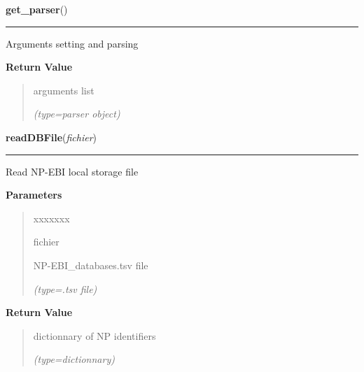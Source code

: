\hspace{.8\funcindent}\begin{boxedminipage}{\funcwidth}

    \raggedright \textbf{get\_parser}()

    \vspace{-1.5ex}

    \rule{\textwidth}{0.5\fboxrule}
\setlength{\parskip}{2ex}
    Arguments setting and parsing

\setlength{\parskip}{1ex}
      \textbf{Return Value}
    \vspace{-1ex}

      \begin{quote}
      arguments list

      {\it (type=parser object)}

      \end{quote}

    \end{boxedminipage}

    \label{VCFtoGO:readDBFile}

    \vspace{0.5ex}

\hspace{.8\funcindent}\begin{boxedminipage}{\funcwidth}

    \raggedright \textbf{readDBFile}(\textit{fichier})

    \vspace{-1.5ex}

    \rule{\textwidth}{0.5\fboxrule}
\setlength{\parskip}{2ex}
    Read NP-EBI local storage file

\setlength{\parskip}{1ex}
      \textbf{Parameters}
      \vspace{-1ex}

      \begin{quote}
        \begin{Ventry}{xxxxxxx}

          \item[fichier]

          NP-EBI\_databases.tsv file

            {\it (type=.tsv file)}

        \end{Ventry}

      \end{quote}

      \textbf{Return Value}
    \vspace{-1ex}

      \begin{quote}
      dictionnary of NP identifiers

      {\it (type=dictionnary)}

      \end{quote}

    \end{boxedminipage}

